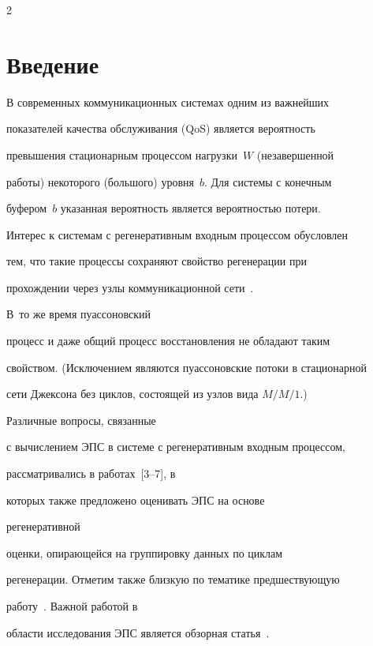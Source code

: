       \begin{multicols}{2}



            \label{st\stat}



\section{Введение}



В современных коммуникационных системах  одним из важнейших

показателей  качества  обслуживания (QoS) является вероятность

превышения стационарным процессом нагрузки~$W$ (незавершенной

работы) некоторого (большого) уровня~$b$. Для системы с конечным

буфером~$b$ указанная  вероятность является вероятностью потери.



Интерес к  системам с регенеративным входным процессом обусловлен

тем, что такие процессы сохраняют  свойство регенерации при

прохождении  через узлы коммуникационной сети~\cite{MorozovTechCyb87, MorozovOutput}. 

В~то же время пуассоновский

процесс   и даже общий процесс восстановления не обладают таким

свойством. (Исключением являются пуассоновские потоки в стационарной

сети Джексона без циклов, со\-сто\-ящей из узлов вида $M/M/1$.)

 Различные вопросы, связанные

с вычислением ЭПС в системе с регенеративным входным процессом,

рассматривались  в работах~[3--7], в

которых также предложено оценивать ЭПС на основе {\it

регенеративной} оценки, опирающейся на группировку данных по циклам

регенерации. Отметим  также близкую по тематике предшествующую

работу~\cite{Crosby}.   Важной работой в

 области исследования ЭПС является обзорная статья~\cite{Kelly}.




\end{multicols}
